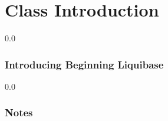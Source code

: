 \part*{Class Introduction}

{\setlength{\baselineskip}%
  {0.0\baselineskip}
  \section*{\flushright Introducing Beginning Liquibase}
  \hrulefill \par}

\newpage
  {\setlength{\baselineskip}%
           {0.0\baselineskip}
  \section*{Notes}
  \hrulefill \par}

